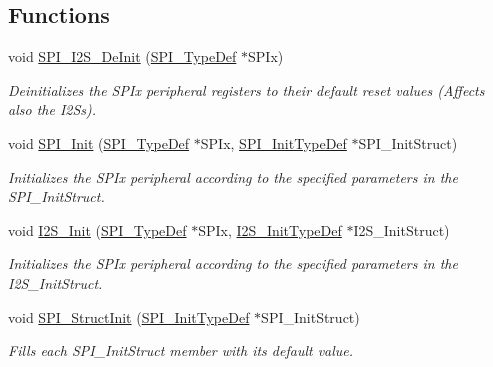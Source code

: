 \subsection*{Functions}
\begin{DoxyCompactItemize}
\item 
void \hyperlink{group___s_p_i___private___functions_gabe36880945fa56785283a9c0092124cc}{S\+P\+I\+\_\+\+I2\+S\+\_\+\+De\+Init} (\hyperlink{struct_s_p_i___type_def}{S\+P\+I\+\_\+\+Type\+Def} $\ast$S\+P\+Ix)
\begin{DoxyCompactList}\small\item\em Deinitializes the S\+P\+Ix peripheral registers to their default reset values (Affects also the I2\+Ss). \end{DoxyCompactList}\item 
void \hyperlink{group___s_p_i___private___functions_ga8dacc1dc48bf08c0f12da409f4889037}{S\+P\+I\+\_\+\+Init} (\hyperlink{struct_s_p_i___type_def}{S\+P\+I\+\_\+\+Type\+Def} $\ast$S\+P\+Ix, \hyperlink{struct_s_p_i___init_type_def}{S\+P\+I\+\_\+\+Init\+Type\+Def} $\ast$S\+P\+I\+\_\+\+Init\+Struct)
\begin{DoxyCompactList}\small\item\em Initializes the S\+P\+Ix peripheral according to the specified parameters in the S\+P\+I\+\_\+\+Init\+Struct. \end{DoxyCompactList}\item 
void \hyperlink{group___s_p_i___private___functions_ga53661884ae4a9640df7cbc59187782f7}{I2\+S\+\_\+\+Init} (\hyperlink{struct_s_p_i___type_def}{S\+P\+I\+\_\+\+Type\+Def} $\ast$S\+P\+Ix, \hyperlink{struct_i2_s___init_type_def}{I2\+S\+\_\+\+Init\+Type\+Def} $\ast$I2\+S\+\_\+\+Init\+Struct)
\begin{DoxyCompactList}\small\item\em Initializes the S\+P\+Ix peripheral according to the specified parameters in the I2\+S\+\_\+\+Init\+Struct. \end{DoxyCompactList}\item 
void \hyperlink{group___s_p_i___private___functions_ga9a0116f88cc2c4478c270f05608703f1}{S\+P\+I\+\_\+\+Struct\+Init} (\hyperlink{struct_s_p_i___init_type_def}{S\+P\+I\+\_\+\+Init\+Type\+Def} $\ast$S\+P\+I\+\_\+\+Init\+Struct)
\begin{DoxyCompactList}\small\item\em Fills each S\+P\+I\+\_\+\+Init\+Struct member with its default value. \end{DoxyCompactList}\item 

\end{DoxyCompactItemize}
